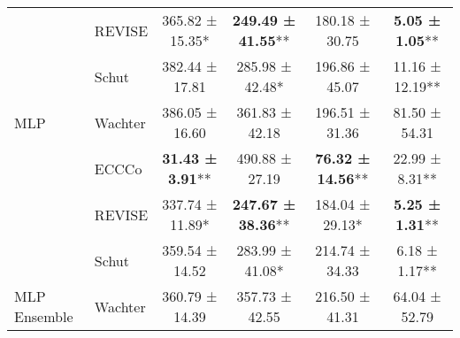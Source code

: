 \begin{table}
{\begin{tabular}[t]{llcccc}
 & REVISE & 365.82 ± 15.35*\hphantom{*} & \textbf{249.49 ± 41.55}** & 180.18 ± 30.75\hphantom{*}\hphantom{*} & \textbf{5.05 ± 1.05}**\\

 & Schut & 382.44 ± 17.81\hphantom{*}\hphantom{*} & 285.98 ± 42.48*\hphantom{*} & 196.86 ± 45.07\hphantom{*}\hphantom{*} & 11.16 ± 12.19**\\

\multirow{-4}{*}{\raggedright\arraybackslash MLP} & Wachter & 386.05 ± 16.60\hphantom{*}\hphantom{*} & 361.83 ± 42.18\hphantom{*}\hphantom{*} & 196.51 ± 31.36\hphantom{*}\hphantom{*} & 81.50 ± 54.31\hphantom{*}\hphantom{*}\\
\cmidrule{1-6}
 & ECCCo & \textbf{31.43 ± 3.91}** & 490.88 ± 27.19\hphantom{*}\hphantom{*} & \textbf{76.32 ± 14.56}** & 22.99 ± 8.31**\\

 & REVISE & 337.74 ± 11.89*\hphantom{*} & \textbf{247.67 ± 38.36}** & 184.04 ± 29.13*\hphantom{*} & \textbf{5.25 ± 1.31}**\\

 & Schut & 359.54 ± 14.52\hphantom{*}\hphantom{*} & 283.99 ± 41.08*\hphantom{*} & 214.74 ± 34.33\hphantom{*}\hphantom{*} & 6.18 ± 1.17**\\

\multirow{-4}{*}{\raggedright\arraybackslash MLP Ensemble} & Wachter & 360.79 ± 14.39\hphantom{*}\hphantom{*} & 357.73 ± 42.55\hphantom{*}\hphantom{*} & 216.50 ± 41.31\hphantom{*}\hphantom{*} & 64.04 ± 52.79\hphantom{*}\hphantom{*}\\
\bottomrule
\end{tabular}}
\end{table}
